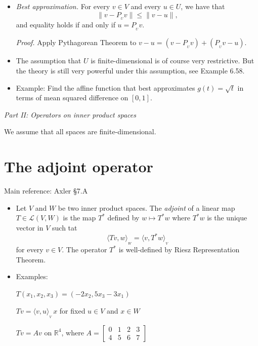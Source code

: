 \documentclass[11pt]{article}
\newcommand{\1}{\mathbf{1}}
\newcommand{\inner}[2]{\langle #1, #2 \rangle}
\newcommand{\proj}[1]{P_{\!\!{}_{#1}}}
\newcommand{\0}{\mathbf{0}}
\newcommand{\R}{\mathbb{R}}
\renewcommand{\leq}{\leqslant}
\newcommand{\spitem}{\item[$\circ$]}
\begin{document}
{\begin{itemize}
\item

\emph{Best approximation.}
For every $v\in V$ and every $u\in U$, we have that
\[
\|v-\proj{U}v\| \leq \|v-u\|,
\]
and equality holds if and only if $u=\proj{U} v$.

\emph{Proof.}
Apply Pythagorean Theorem to $v-u=(v - \proj{U} v) + (\proj{U} v - u)$.

\item

The assumption that $U$ is finite-dimensional is of course very restrictive.
But the theory is still very powerful under this assumption, see Example 6.58.

\spitem

Example:
Find the affine function that best approximates $g(t)=\sqrt{t}$ in terms of mean squared difference on $[0,1]$.

\end{itemize}


\clearpage

\hfil
\emph{\Large Part II: Operators on inner product spaces}

\bigskip

\hfill
We assume that all spaces are finite-dimensional.

\section{The adjoint operator}

Main reference:
Axler \S7.A

\begin{itemize}

\item

Let $V$ and $W$ be two inner product spaces. The \emph{adjoint} of a linear map $T\in\mathcal{L}(V,W)$ is the map $T^*$ defined by $w \mapsto T^* w$ where $T^* w$ is the unique vector in $V$ such tat
$$\langle Tv,w\rangle_{{}_W} = \langle v,T^*w\rangle_{{}_V}$$ for every $v\in V$.
The operator $T^*$ is well-defined by Riesz Representation Theorem.

\item

Examples:

$T(x_1,x_2,x_3)=(- 2 x_2, 5 x_3 - 3 x_1)$

$Tv = \inner{v}{u}_{{}_V} \, x$ for fixed $u\in V$ and $x\in W$

$Tv = Av$ on $\R^4$, where
$ A =
\left[ \begin{array}{cccc}
0 & 1 & 2 & 3 \\
4 & 5 & 6 & 7
\end{array} \right]$


\end{itemize}}
\end{document}
